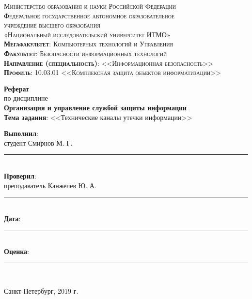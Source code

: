\begin{titlepage}
	\begin{center}
		\textsc{
			\fontsize{12pt}{14pt}\selectfont
			Министерство образования и науки Российской Федерации\\
			Федеральное государственное автономное образовательное\\
			учреждение высшего образования\\
			«Национальный исследовательский университет ИТМО»\\
			\textbf{Мегафакультет}:  Компьютерных технологий и Управления\\
			\textbf{Факультет}: Безопасности информационных технологий\\
			\textbf{Направление (специальность)}: <<Информационная безопасность>>\\
			\textbf{Профиль}: 10.03.01 <<Комплексная защита объектов информатизации>>}
		
		\vfill
		
		\textbf{Реферат}\\
		по дисциплине\\
		\textbf{Организация и управление службой защиты информации}\\
	\vfill
	\textbf{Тема задания}: <<Технические каналы утечки информации>>\\
	\end{center}

	\vfill
	
	\begin{flushright}
	\textbf{Выполнил}: \\студент Смирнов М. Г. \rule{5em}{.1pt}\\
	\textbf{Проверил}: \\преподаватель Канжелев Ю. А.\rule{5em}{.1pt}\\
		\vfill
	\textbf{Дата}: \rule{10em}{.1pt}\\
	\textbf{Оценка}: \rule{10em}{.1pt}\\

	\vfill
	


	\end{flushright}
	\vfill
	\begin{center}
		Санкт-Петербург, 2019 г.
	\end{center}
\end{titlepage}